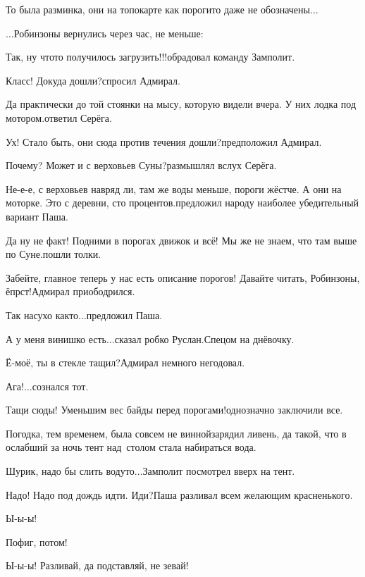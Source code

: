 \diagdash То была разминка, они на топокарте как пороги\sdash то даже не обозначены$\ldots$

$\ldots$Робинзоны вернулись через час, не меньше:

\diagdash Так, ну что\sdash то получилось загрузить!!!\mdash обрадовал команду Замполит.

\diagdash Класс! Докуда дошли?\mdash спросил Адмирал.

\diagdash Да практически до той стоянки на мысу, которую видели вчера. У них лодка под мотором.\mdash ответил Серёга.

\diagdash Ух! Стало быть, они сюда против течения дошли?\mdash предположил Адмирал.

\diagdash Почему? Может и с верховьев Суны?\mdash размышлял вслух Серёга.

\diagdash Не-е-е, с верховьев навряд ли, там же воды меньше, пороги жёстче. А они на моторке. Это с деревни, сто процентов.\mdash предложил народу наиболее убедительный вариант Паша.

\diagdash Да ну не факт! Подними в порогах движок и всё! Мы же не знаем, что там выше по Суне.\mdash пошли толки.

\diagdash Забейте, главное теперь у нас есть описание порогов! Давайте читать, Робинзоны, ёпрст!\mdash Адмирал приободрился.

\diagdash Так насухо как\sdash то$\ldots$\mdash предложил Паша.

\diagdash А у меня винишко есть$\ldots$\mdash сказал робко Руслан.\mdash Спецом на днёвочку.

\diagdash Ё-моё, ты в стекле тащил?\mdash Адмирал немного негодовал.

\diagdash Ага!$\ldots$\mdash сознался тот.

\diagdash Тащи сюды! Уменьшим вес байды перед порогами!\mdash однозначно заключили все.

Погодка, тем временем, была совсем не винной\mdash зарядил ливень, да такой, что в ослабший за ночь тент над~столом стала набираться вода.

\diagdash Шурик, надо бы слить воду\sdash то$\ldots$\mdash Замполит посмотрел вверх на тент.

\diagdash Надо! Надо под дождь идти. Иди?\mdash Паша разливал всем желающим красненького.

\diagdash Ы-ы-ы!

\diagdash Пофиг, потом!

\diagdash Ы-ы-ы! Разливай, да подставляй, не зевай!

